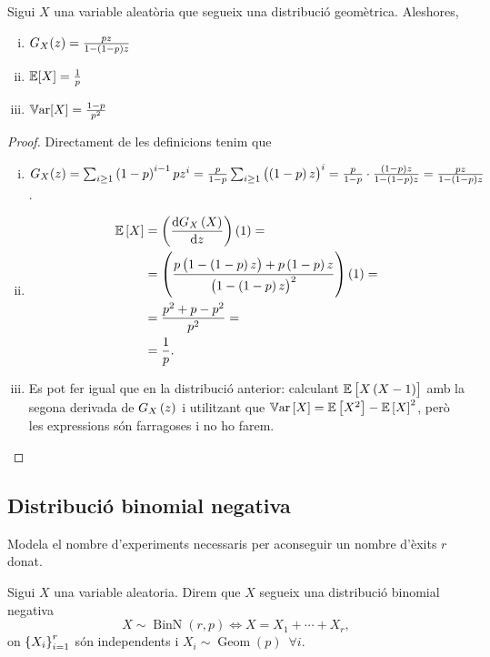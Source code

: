 \begin{prop}
    Sigui $X$ una variable aleatòria que segueix una distribució geomètrica. Aleshores,
    \begin{enumerate}[i)]
        \item $G_X(z) =  \frac{pz}{1-\left( 1-p\right) z}$
        \item $\operatorname{\mathbb{E}}[X] = \frac{1}{p}$
        \item $\operatorname{\mathbb{V}ar}[X] = \frac{1-p}{p^2}$
    \end{enumerate}
\end{prop}
\begin{proof}
    Directament de les definicions tenim que
    \begin{enumerate}[i)]
        \item $G_X(z) = \sum_{i\geq 1}\left( 1-p \right) ^{i-1}p z^i = \frac{p}{1-p}\sum_{i\geq 1}\left(\left( 1-p \right) z\right)^{i} = 
        \frac{p}{1-p}\cdot\frac{\left( 1-p \right) z}{1-\left( 1-p\right) z}= \frac{pz}{1-\left( 1-p\right) z}$.
        \item 
            \begin{align*}
                \esp\lb X\rb &= \lp \frac{\dif G_X\lp X\rp}{\dif z}\rp \lp 1\rp =\\
                &=\lp\frac{p\lp 1-\lp 1-p\rp z\rp+p\lp 1-p\rp z}{\lp 1-\lp 1-p\rp z\rp ^2}\rp\lp 1\rp =\\
                &=\frac{p^2+p-p^2}{p^2}=\\
                &=\frac{1}{p}.
            \end{align*}
        \item Es pot fer igual que en la distribució anterior: calculant $\operatorname{\mathbb{E}}\left[ X\left( X-1\right)\right]$ amb la segona derivada de $G_X\left( z\right)$ i utilitzant que $\operatorname{\mathbb{V}ar}\left[ X\right] = \operatorname{\mathbb{E}}\left[ X^2\right] - \operatorname{\mathbb{E}}\left[ X\right] ^2$, però les expressions són farragoses i no ho farem.
    \end{enumerate}
\end{proof}

\subsection*{Distribució binomial negativa}

Modela el nombre d'experiments necessaris per aconseguir un nombre d'èxits $r$ donat.

\begin{defi}
    Sigui $X$ una variable aleatoria. Direm que $X$ segueix una distribució binomial negativa
    \[X \sim \operatorname{BinN}(r,p) \iff X = X_1 + \cdots + X_r,\]
    on $\left\{ X_i \right\}_{i=1}^{r}$ són independents i $X_i \sim \operatorname{Geom}(p) \enspace\forall i$.
\end{defi}

